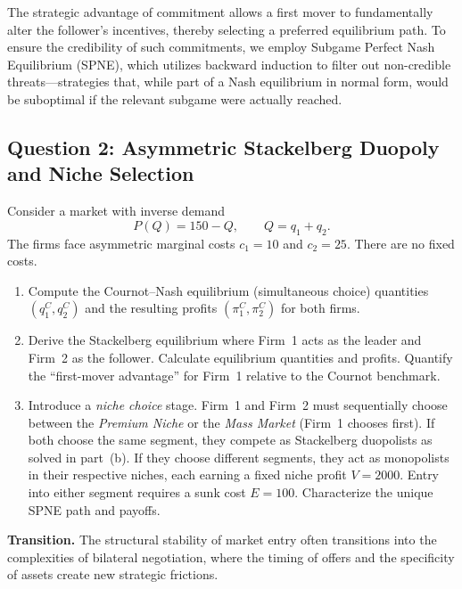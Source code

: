 \documentclass[12pt,a4paper]{article}
\begin{document}
The strategic advantage of commitment allows a first mover to fundamentally alter the follower's
incentives, thereby selecting a preferred equilibrium path. To ensure the credibility of such
commitments, we employ Subgame Perfect Nash Equilibrium (SPNE), which utilizes backward induction
to filter out non-credible threats---strategies that, while part of a Nash equilibrium in normal
form, would be suboptimal if the relevant subgame were actually reached.

\subsection*{Question 2: Asymmetric Stackelberg Duopoly and Niche Selection}

Consider a market with inverse demand
\[
  P(Q) = 150 - Q, \qquad Q = q_1 + q_2.
\]
The firms face asymmetric marginal costs \(c_1 = 10\) and \(c_2 = 25\). There are no fixed costs.

\begin{enumerate}
  \item Compute the Cournot--Nash equilibrium (simultaneous choice) quantities \((q_1^C, q_2^C)\)
        and the resulting profits \((\pi_1^C, \pi_2^C)\) for both firms.
  \item Derive the Stackelberg equilibrium where Firm~1 acts as the leader and Firm~2 as the
        follower. Calculate equilibrium quantities and profits. Quantify the ``first-mover
        advantage'' for Firm~1 relative to the Cournot benchmark.
  \item Introduce a \emph{niche choice} stage. Firm~1 and Firm~2 must sequentially choose between
        the \emph{Premium Niche} or the \emph{Mass Market} (Firm~1 chooses first). If both choose
        the same segment, they compete as Stackelberg duopolists as solved in part~(b). If they
        choose different segments, they act as monopolists in their respective niches, each earning
        a fixed niche profit \(V = 2000\). Entry into either segment requires a sunk cost
        \(E = 100\). Characterize the unique SPNE path and payoffs.
\end{enumerate}

\bigskip
\noindent\textbf{Transition.}
The structural stability of market entry often transitions into the complexities of bilateral
negotiation, where the timing of offers and the specificity of assets create new strategic
frictions.

\bigskip
\noindent\hrulefill
\bigskip
\end{document}
